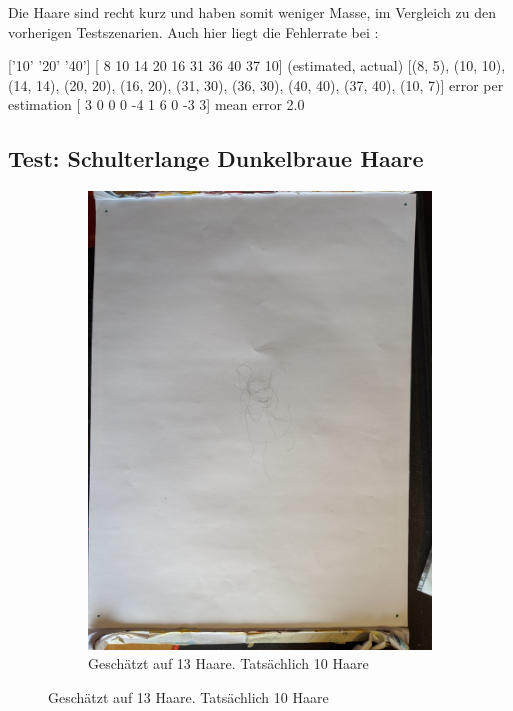 \documentclass[german,a4paper, 12pt]{llncs}
\begin{document}
Die Haare sind recht kurz und haben somit weniger Masse, im Vergleich zu den vorherigen Testszenarien. Auch hier liegt die Fehlerrate bei :  

['10' '20' '40']
[ 8 10 14 20 16 31 36 40 37 10]
(estimated, actual)
[(8, 5), (10, 10), (14, 14), (20, 20), (16, 20), (31, 30), (36, 30), (40, 40), (37, 40), (10, 7)]
error per estimation [ 3  0  0  0 -4  1  6  0 -3  3]
mean error 2.0

\subsection{Test: Schulterlange Dunkelbraue Haare}

\begin{figure}
	\centering
	\begin{subfigure}[b]{0.475\textwidth}
		\centering
		\includegraphics[width=\textwidth]{figMama/IMG_20200327_140450_10.jpg}
		\caption[]{Geschätzt auf 13 Haare. Tatsächlich 10 Haare}
		\label{img:tstJan1} 

\end{subfigure}
\end{figure}
\end{document}
